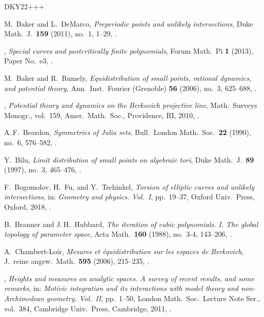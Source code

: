 \begin{thebibliography}{DKY22+++}
  
M.~Baker and L.~DeMarco,
\emph{Preperiodic points and unlikely intersections},
Duke Math.~J.\ \textbf{159} (2011), no.~1, 1--29,
.

\bysame, 
\emph{Special curves and postcritically finite polynomials},
Forum Math.\ Pi \textbf{1} (2013), Paper No.~e3,
.

M.~Baker and R.~Rumely,
\emph{Equidistribution of small points, rational dynamics, and potential theory}, Ann.\ Inst.\ Fourier (Grenoble) \textbf{56} (2006), no.~3, 625--688,
.

\bysame,
\emph{Potential theory and dynamics on the Berkovich projective line},
Math.\ Surveys  Monogr., vol.~159,
Amer.\ Math.\ Soc., Providence, RI, 2010, .

A.\,F.~Beardon,
\emph{Symmetries of Julia sets},
Bull.\ London Math.\ Soc.\ \textbf{22} (1990), no.~6, 576--582,
.

Y.~Bilu,
\emph{Limit distribution of small points on algebraic tori},
Duke Math.~J.\ \textbf{89} (1997), no.~3, 465--476,
.

F.~Bogomolov, H.~Fu, and Y.~Tschinkel,
\emph{Torsion of elliptic curves and unlikely intersections}, in:
\emph{Geometry and physics. Vol.~I}, pp.~19--37, Oxford Univ.\ Press, Oxford, 2018, .

B.~Branner and J.\,H.~Hubbard,
\emph{The iteration of cubic polynomials. I. The global topology of parameter space},
Acta Math.\ \textbf{160} (1988), no.~3-4, 143--206,
.

A.~Chambert-Loir,
\emph{Mesures et \'equidistribution sur les espaces de Berkovich},
J.~reine angew.\ Math.\ \textbf{595} (2006), 215--235,
.

\bysame,
\emph{Heights and measures on analytic spaces. A survey of recent results, and some remarks},
in: \emph{Motivic integration and its interactions with model theory and non-Archimedean geometry. Vol.~II}, pp.~1--50,
London Math.\ Soc.\ Lecture Note Ser., vol.~384,
Cambridge Univ.\ Press, Cambridge, 2011,
.


\end{thebibliography}
